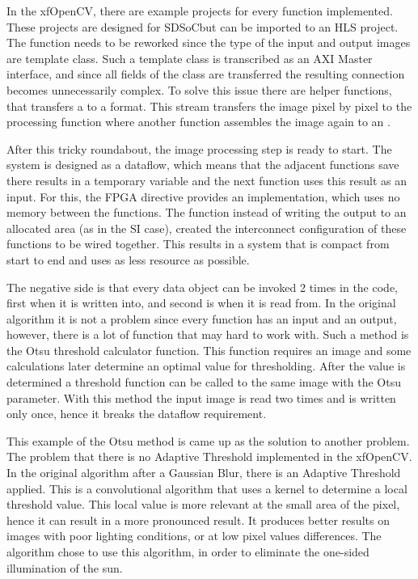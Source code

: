 In the xfOpenCV, there are example projects for every function implemented.
These projects are designed for SDSoC\texttrademark but can be imported to an HLS project.
The function needs to be reworked since the type of the input and output images are  template class.
Such a template class is transcribed as an AXI Master interface, and since all fields of the class are transferred the resulting connection becomes unnecessarily complex.
To solve this issue there are helper functions, that transfers a  to a  format.
This stream transfers the image pixel by pixel to the processing function where another function assembles the image again to an .

After this tricky roundabout, the image processing step is ready to start.
The system is designed as a dataflow, which means that the adjacent functions save there results in a temporary variable and the next function uses this result as an input.
For this, the FPGA  directive provides an implementation, which uses no memory between the functions.
The function instead of writing the output to an allocated area (as in the SI case), created the interconnect configuration of these functions to be wired together.
This results in a system that is compact from start to end and uses as less resource as possible.

The negative side is that every data object can be invoked 2 times in the code, first when it is written into, and second is when it is read from.
In the original algorithm it is not a problem since every function has an input and an output, however, there is a lot of function that may hard to work with.
Such a method is the Otsu \cite{4310076} threshold calculator function.
This function requires an image and some calculations later determine an optimal value for thresholding.
After the value is determined a threshold function can be called to the same image with the Otsu parameter.
With this method the input image is read two times and is written only once, hence it breaks the dataflow requirement.

This example of the Otsu method is came up as the solution to another problem.
The problem that there is no Adaptive Threshold implemented in the xfOpenCV.
In the original algorithm after a Gaussian Blur, there is an Adaptive Threshold \cite{pratt2001digital} \cite{yanowitz1989new} applied.
This is a convolutional algorithm that uses a kernel to determine a local threshold value.
This local value is more relevant at the small area of the pixel, hence it can result in a more pronounced result.
It produces better results on images with poor lighting conditions, or at low pixel values differences.
The algorithm chose to use this algorithm, in order to eliminate the one-sided illumination of the sun.

